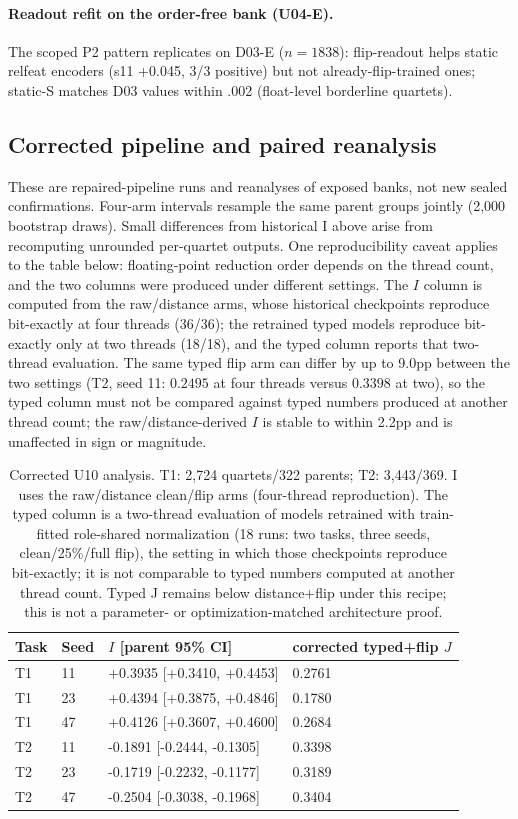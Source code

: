 \paragraph{Readout refit on the order-free bank (U04-E).} The scoped P2 pattern replicates on D03-E ($n{=}1838$): flip-readout helps static relfeat encoders (s11 +0.045, 3/3 positive) but not already-flip-trained ones; static-S matches D03 values within .002 (float-level borderline quartets).
\subsection{Corrected pipeline and paired reanalysis}
These are repaired-pipeline runs and reanalyses of exposed banks, not new sealed confirmations. Four-arm intervals resample the same parent groups jointly (2,000 bootstrap draws). Small differences from historical I above arise from recomputing unrounded per-quartet outputs. One reproducibility caveat applies to the table below: floating-point reduction order depends on the thread count, and the two columns were produced under different settings. The $I$ column is computed from the raw/distance arms, whose historical checkpoints reproduce bit-exactly at four threads (36/36); the retrained typed models reproduce bit-exactly only at two threads (18/18), and the typed column reports that two-thread evaluation. The same typed flip arm can differ by up to 9.0pp between the two settings (T2, seed 11: $0.2495$ at four threads versus $0.3398$ at two), so the typed column must not be compared against typed numbers produced at another thread count; the raw/distance-derived $I$ is stable to within 2.2pp and is unaffected in sign or magnitude.
\begin{table}[t]\centering\small
\begin{tabular}{@{}llll@{}}\toprule
Task & Seed & $I$ [parent 95\% CI] & corrected typed+flip $J$ \\
\midrule
T1 & 11 & +0.3935 [+0.3410, +0.4453] & 0.2761 \\
T1 & 23 & +0.4394 [+0.3875, +0.4846] & 0.1780 \\
T1 & 47 & +0.4126 [+0.3607, +0.4600] & 0.2684 \\
T2 & 11 & -0.1891 [-0.2444, -0.1305] & 0.3398 \\
T2 & 23 & -0.1719 [-0.2232, -0.1177] & 0.3189 \\
T2 & 47 & -0.2504 [-0.3038, -0.1968] & 0.3404 \\
\bottomrule\end{tabular}
\caption{Corrected U10 analysis. T1: 2,724 quartets/322 parents; T2: 3,443/369. I uses the raw/distance clean/flip arms (four-thread reproduction). The typed column is a two-thread evaluation of models retrained with train-fitted role-shared normalization (18 runs: two tasks, three seeds, clean/25\%/full flip), the setting in which those checkpoints reproduce bit-exactly; it is not comparable to typed numbers computed at another thread count. Typed J remains below distance+flip under this recipe; this is not a parameter- or optimization-matched architecture proof.}\label{tab:u10fixed}\end{table}
